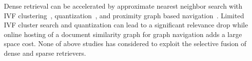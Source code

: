 Dense retrieval can be accelerated  by approximate nearest neighbor  search with 
IVF clustering~\cite{johnson2019billion, 2021Facebook-DrBoost-Lewis}, quantization~\cite{2021CIKM-JPQ-Zhan,  2022WSDM-Zhan-RepCONC, Xiao2022Distill-VQ},
and  proximity graph based navigation~\cite{2020TPAMI-HNSW,2022CIKM-MacAvaneyGraphReRank,2023SIGIR-LADR}. 
Limited IVF cluster search and quantization can lead to  a significant  relevance drop while 
online hosting of a document similarity graph  for graph navigation adds a large space cost.
None of above studies has considered to exploit the selective fusion of dense and sparse  retrievers. 
